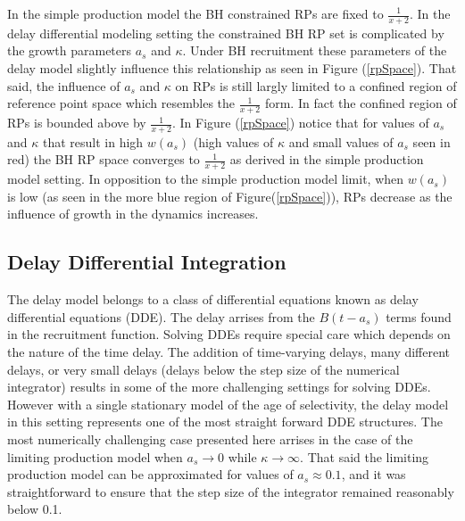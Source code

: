 %
In the simple production model the BH constrained RPs are fixed to $\frac{1}{x+2}$.
In the delay differential modeling setting the constrained BH RP set is
complicated by the growth parameters $a_s$ and $\kappa$.
Under BH recruitment these parameters of the delay model slightly %
influence this relationship as seen in Figure (\ref{rpSpace}). That said,
the influence of $a_s$ and $\kappa$ on RPs is still largly limited to a
confined region of reference point space which resembles the $\frac{1}{x+2}$
form. In fact the confined region of RPs is bounded above by $\frac{1}{x+2}$. %
In Figure (\ref{rpSpace}) notice that for values of $a_s$ and $\kappa$ that
result in high $w(a_s)$ (high values of $\kappa$ and small values of $a_s$ seen
in red) the BH RP space converges to $\frac{1}{x+2}$ as derived in the simple
production model setting. In opposition to the simple production model limit,
when $w(a_s)$ is low (as seen in the more blue region of Figure(\ref{rpSpace})), RPs
decrease as the influence of growth in the dynamics increases.

%
\subsection{Delay Differential Integration}

%
The delay model belongs to a class of differential equations known as delay
differential equations (DDE). The delay arrises from the $B(t-a_s)$ terms
found in the recruitment function. Solving DDEs require special care which
depends on the nature of the time delay. The addition of time-varying delays,
many different delays, or very small delays (delays below the step size of the
numerical integrator) results in some of the more challenging settings for
solving DDEs. However with a single stationary model of the age of selectivity,
the delay model in this setting represents one of the most straight forward
DDE structures. The most numerically challenging case presented here arrises
in the case of the limiting production model when $a_s\to0$ while $\kappa\to\infty$.
That said the limiting production model can be approximated for values of
$a_s\approx0.1$, and it was straightforward to ensure that the step size of
the integrator remained reasonably below 0.1.

